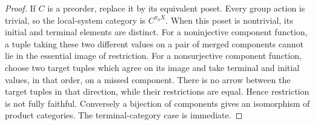 \begin{proof}
If $C$ is a preorder, replace it by its equivalent poset. Every group action is trivial, so the local-system category is $C^{\pi_0X}$. When this poset is nontrivial, its initial and terminal elements are distinct. For a noninjective component function, a tuple taking these two different values on a pair of merged components cannot lie in the essential image of restriction. For a nonsurjective component function, choose two target tuples which agree on its image and take terminal and initial values, in that order, on a missed component. There is no arrow between the target tuples in that direction, while their restrictions are equal. Hence restriction is not fully faithful. Conversely a bijection of components gives an isomorphism of product categories. The terminal-category case is immediate.
\end{proof}
